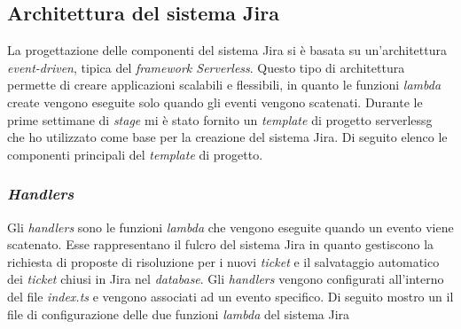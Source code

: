 \subsection{Architettura del sistema Jira}
La progettazione delle componenti del sistema Jira si è basata su un'architettura \textit{event-driven}, tipica del \textit{framework Serverless}. Questo tipo di architettura permette di creare applicazioni scalabili e flessibili, in quanto le funzioni \textit{lambda} create vengono eseguite solo quando gli eventi vengono scatenati. 
Durante le prime settimane di \textit{stage} mi è stato fornito un \textit{template} di progetto \gls{serverlessg} che ho utilizzato come base per la creazione del sistema Jira. Di seguito elenco le componenti principali del \textit{template} di progetto.

\subsubsection{\textit{Handlers}}
Gli \textit{handlers} sono le funzioni \textit{lambda} che vengono eseguite quando un evento viene scatenato. Esse rappresentano il fulcro del sistema Jira in quanto gestiscono la richiesta di proposte di risoluzione per i nuovi \textit{ticket} e il salvataggio automatico dei \textit{ticket} chiusi in Jira nel \textit{database}. 
Gli \textit{handlers} vengono configurati all'interno del file \textit{index.ts} e vengono associati ad un evento specifico. Di seguito mostro un il file di configurazione delle due funzioni \textit{lambda} del sistema Jira

